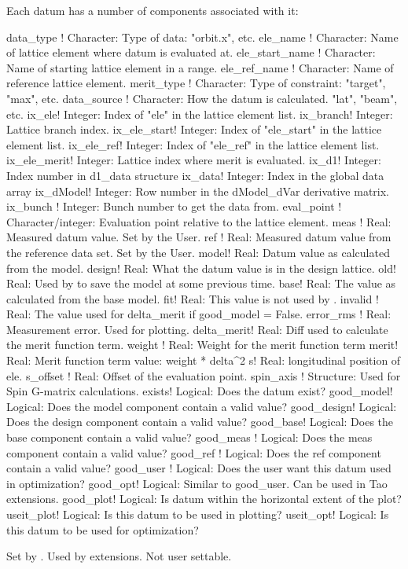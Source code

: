 Each datum has a number of components associated with it:
\begin{example}
  data_type        ! Character: Type of data: "orbit.x", etc.
  ele_name         ! Character: Name of lattice element where datum is evaluated at.
  ele_start_name   ! Character: Name of starting lattice element in a range.
  ele_ref_name     ! Character: Name of reference lattice element.
  merit_type       ! Character: Type of constraint: "target", "max", etc.
  data_source      ! Character: How the datum is calculated. "lat", "beam", etc.
  ix_ele\Ss          ! Integer: Index of "ele" in the lattice element list.
  ix_branch\Ss        ! Integer: Lattice branch index.
  ix_ele_start\Ss     ! Integer: Index of "ele_start" in the lattice element list.
  ix_ele_ref\Ss       ! Integer: Index of "ele_ref" in the lattice element list.
  ix_ele_merit\Ss     ! Integer: Lattice index where merit is evaluated.
  ix_d1\Ss            ! Integer: Index number in d1_data structure
  ix_data\Ss          ! Integer: Index in the global data array
  ix_dModel\Ss        ! Integer: Row number in the dModel_dVar derivative matrix.
  ix_bunch         ! Integer: Bunch number to get the data from.
  eval_point       ! Character/integer: Evaluation point relative to the lattice element.
  meas             ! Real: Measured datum value. Set by the User.
  ref              ! Real: Measured datum value from the reference data set. Set by the User.
  model\Ss            ! Real: Datum value as calculated from the model.
  design\Ss           ! Real: What the datum value is in the design lattice.
  old\Ss              ! Real: Used by \tao to save the model at some previous time.
  base\Ss             ! Real: The value as calculated from the base model.
  fit\Dd              ! Real: This value is not used by \tao.
  invalid          ! Real: The value used for delta_merit if good_model = False.
  error_rms        ! Real: Measurement error. Used for plotting.
  delta_merit\Ss      ! Real: Diff used to calculate the merit function term.
  weight           ! Real: Weight for the merit function term
  merit\Ss            ! Real: Merit function term value: weight * delta^2
  s\Ss                ! Real: longitudinal position of ele.
  s_offset         ! Real: Offset of the evaluation point.
  spin_axis        ! Structure: Used for Spin G-matrix calculations.
  exists\Ss           ! Logical: Does the datum exist?
  good_model\Ss       ! Logical: Does the model  component contain a valid value?
  good_design\Ss      ! Logical: Does the design component contain a valid value?
  good_base\Ss        ! Logical: Does the base   component contain a valid value?
  good_meas        ! Logical: Does the meas   component contain a valid value?
  good_ref         ! Logical: Does the ref    component contain a valid value?
  good_user        ! Logical: Does the user want this datum used in optimization?
  good_opt\Dd         ! Logical: Similar to good_user. Can be used in Tao extensions.
  good_plot\Dd        ! Logical: Is datum within the horizontal extent of the plot?
  useit_plot\Ss       ! Logical: Is this datum to be used in plotting?
  useit_opt\Ss        ! Logical: Is this datum to be used for optimization?
\end{example}
\Ss Set by \tao. \Dd Used by \tao extensions. Not user settable.

